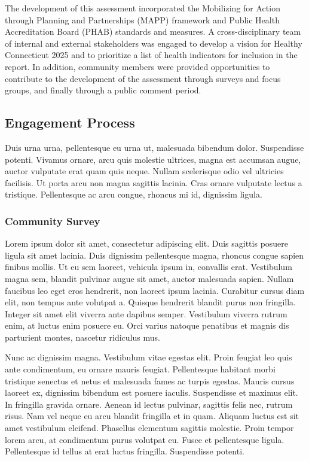 \documentclass[
  letterpaper,
  DIV=11,
  numbers=noendperiod]{scrreprt}
\begin{document}
The development of this assessment incorporated the Mobilizing for
Action through Planning and Partnerships (MAPP) framework and Public
Health Accreditation Board (PHAB) standards and measures. A
cross-disciplinary team of internal and external stakeholders was
engaged to develop a vision for Healthy Connecticut 2025 and to
prioritize a list of health indicators for inclusion in the report. In
addition, community members were provided opportunities to contribute to
the development of the assessment through surveys and focus groups, and
finally through a public comment period.

\subsection{Engagement Process}\label{engagement-process}

Duis urna urna, pellentesque eu urna ut, malesuada bibendum dolor.
Suspendisse potenti. Vivamus ornare, arcu quis molestie ultrices, magna
est accumsan augue, auctor vulputate erat quam quis neque. Nullam
scelerisque odio vel ultricies facilisis. Ut porta arcu non magna
sagittis lacinia. Cras ornare vulputate lectus a tristique. Pellentesque
ac arcu congue, rhoncus mi id, dignissim ligula.

\subsubsection{Community Survey}\label{community-survey}

Lorem ipsum dolor sit amet, consectetur adipiscing elit. Duis sagittis
posuere ligula sit amet lacinia. Duis dignissim pellentesque magna,
rhoncus congue sapien finibus mollis. Ut eu sem laoreet, vehicula ipsum
in, convallis erat. Vestibulum magna sem, blandit pulvinar augue sit
amet, auctor malesuada sapien. Nullam faucibus leo eget eros hendrerit,
non laoreet ipsum lacinia. Curabitur cursus diam elit, non tempus ante
volutpat a. Quisque hendrerit blandit purus non fringilla. Integer sit
amet elit viverra ante dapibus semper. Vestibulum viverra rutrum enim,
at luctus enim posuere eu. Orci varius natoque penatibus et magnis dis
parturient montes, nascetur ridiculus mus.

Nunc ac dignissim magna. Vestibulum vitae egestas elit. Proin feugiat
leo quis ante condimentum, eu ornare mauris feugiat. Pellentesque
habitant morbi tristique senectus et netus et malesuada fames ac turpis
egestas. Mauris cursus laoreet ex, dignissim bibendum est posuere
iaculis. Suspendisse et maximus elit. In fringilla gravida ornare.
Aenean id lectus pulvinar, sagittis felis nec, rutrum risus. Nam vel
neque eu arcu blandit fringilla et in quam. Aliquam luctus est sit amet
vestibulum eleifend. Phasellus elementum sagittis molestie. Proin tempor
lorem arcu, at condimentum purus volutpat eu. Fusce et pellentesque
ligula. Pellentesque id tellus at erat luctus fringilla. Suspendisse
potenti.
\end{document}
